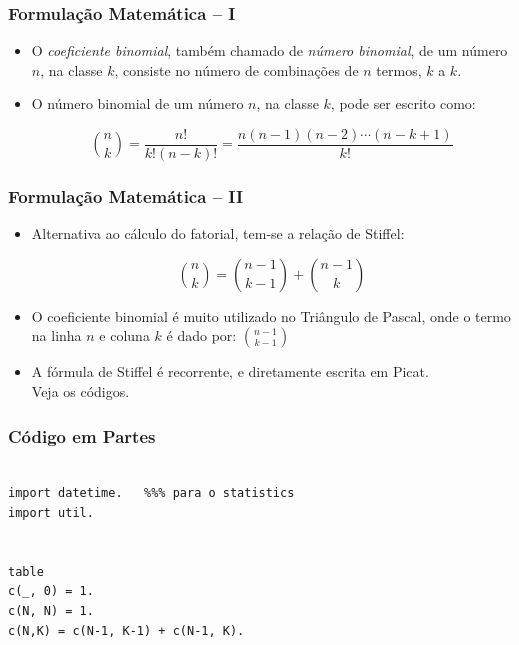 
\begin{frame}[fragile]

\frametitle{Formulação Matemática -- I}

\begin{itemize}
  \item O \textit{coeficiente binomial}, também chamado de \textit{número binomial}, 
de um número $n$, na classe $k$, consiste no número de combinações de $n$ termos, $k$ a $k$. 

\pause
  \item O número binomial de um número $n$, na classe $k$, pode ser escrito como:

$$ {n \choose k}= \frac {n!}{k!(n-k)!}=\frac {n(n-1)(n-2)\cdots(n-k+1)}{k!}$$
\end{itemize}   
    
\end{frame}



\begin{frame}[fragile]

\frametitle{Formulação Matemática -- II}

\begin{itemize}
  \item Alternativa ao cálculo do fatorial, tem-se a relação de Stiffel:

$$ {n\choose k}={n-1\choose k-1}+{n-1\choose k}$$
    

\pause
  \item  O coeficiente binomial é muito utilizado no Triângulo de Pascal, onde o 
  termo na linha $n$ e coluna $k$ é  dado por: ${n-1 \choose k-1}$
  
  \pause
  \item A fórmula de Stiffel é recorrente, e diretamente escrita em Picat.\\
  Veja os códigos.
\end{itemize}   
    
\end{frame}




\begin{frame}[fragile] 

\frametitle{Código em Partes}

\begin{verbatim}

import datetime.   %%% para o statistics
import util.


table
c(_, 0) = 1.
c(N, N) = 1.
c(N,K) = c(N-1, K-1) + c(N-1, K).

\end{verbatim}
    
\end{frame}



